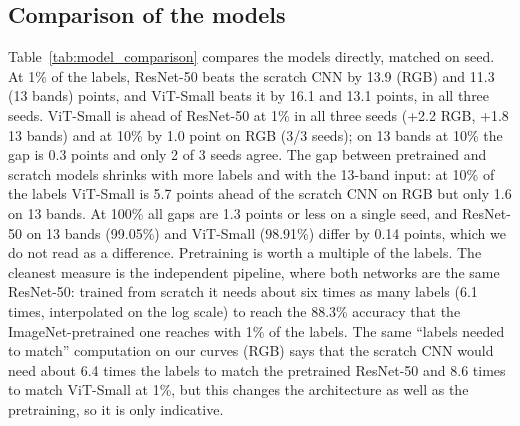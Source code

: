\documentclass[conference]{IEEEtran}
\newcommand{\tabdir}{../results/tables}
\begin{document}


\subsection{Comparison of the models}
Table~\ref{tab:model_comparison} compares the models directly, matched on seed. At 1\% of the labels, ResNet-50 beats the scratch CNN by 13.9 (RGB) and 11.3 (13 bands) points, and ViT-Small beats it by 16.1 and 13.1 points, in all three seeds. ViT-Small is ahead of ResNet-50 at 1\% in all three seeds (+2.2 RGB, +1.8 13 bands) and at 10\% by 1.0 point on RGB (3/3 seeds); on 13 bands at 10\% the gap is 0.3 points and only 2 of 3 seeds agree. The gap between pretrained and scratch models shrinks with more labels and with the 13-band input: at 10\% of the labels ViT-Small is 5.7 points ahead of the scratch CNN on RGB but only 1.6 on 13 bands. At 100\% all gaps are 1.3 points or less on a single seed, and ResNet-50 on 13 bands (99.05\%) and ViT-Small (98.91\%) differ by 0.14 points, which we do not read as a difference. Pretraining is worth a multiple of the labels. The cleanest measure is the independent pipeline, where both networks are the same ResNet-50: trained from scratch it needs about six times as many labels (6.1 times, interpolated on the log scale) to reach the 88.3\% accuracy that the ImageNet-pretrained one reaches with 1\% of the labels. The same ``labels needed to match'' computation on our curves (RGB) says that the scratch CNN would need about 6.4 times the labels to match the pretrained ResNet-50 and 8.6 times to match ViT-Small at 1\%, but this changes the architecture as well as the pretraining, so it is only indicative.


\end{document}
